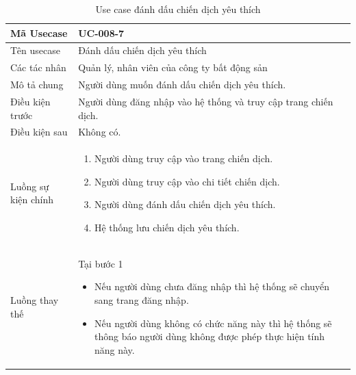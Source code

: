 \documentclass[12pt,a4paper]{article}
\begin{document}
    \begin{table}[H]
        \centering
        \begin{tabular}{|p{3.5cm}|p{11.5cm}|c|}
            \hline
            Mã Usecase      & UC-008-7                                                        \\
            \hline
            Tên usecase     & Đánh dấu chiến dịch yêu thích                                   \\
            \hline
            Các tác nhân    & Quản lý, nhân viên của công ty bất động sản                     \\
            \hline
            Mô tả chung     & Người dùng muốn đánh dấu chiến dịch yêu thích.                  \\
            \hline

            Điều kiện trước & Người dùng đăng nhập vào hệ thống và truy cập trang chiến dịch. \\
            \hline

            Điều kiện sau   & Không có.                                                       \\
            \hline

            Luồng sự kiện chính & \vspace{-.8cm}\begin{enumerate}
                                                    \item Người dùng truy cập vào trang chiến dịch.
                                                    \item Người dùng truy cập vào chi tiết chiến dịch.
                                                    \item Người dùng đánh dấu chiến dịch yêu thích.
                                                    \item Hệ thống lưu chiến dịch yêu thích.
            \end{enumerate}
            \\
            \hline
            Luồng thay thế & Tại bước 1\newline
            \vspace{-.8cm}\begin{itemize}
                              \item Nếu người dùng chưa đăng nhập thì hệ thống sẽ chuyển sang trang đăng nhập.
                              \item Nếu người dùng không có chức năng này thì hệ thống sẽ thông báo người dùng không được phép thực hiện tính năng này.
            \end{itemize}
            \\ \hline
        \end{tabular}
        \caption{Use case đánh dấu chiến dịch yêu thích}

    \end{table}
\end{document}
